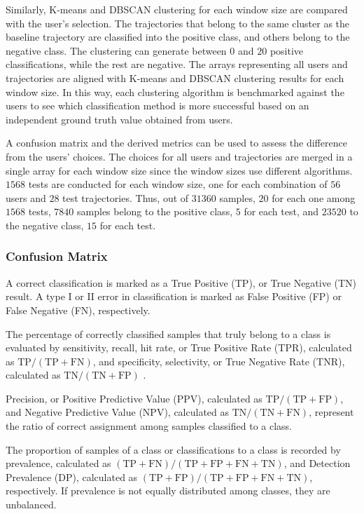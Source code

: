 \documentclass[preprint,12pt]{elsarticle}
\begin{document}
Similarly, K-means and DBSCAN clustering for each window size are compared with the user's selection. The trajectories that belong to the same cluster as the baseline trajectory are classified into the positive class, and others belong to the negative class. The clustering can generate between $0$ and $20$ positive classifications, while the rest are negative. The arrays representing all users and trajectories are aligned with K-means and DBSCAN clustering results for each window size. In this way, each clustering algorithm is benchmarked against the users to see which classification method is more successful based on an independent ground truth value obtained from users.

A confusion matrix and the derived metrics can be used to assess the difference from the users' choices. The choices for all users and trajectories are merged in a single array for each window size since the window sizes use different algorithms. $1568$ tests are conducted for each window size, one for each combination of $56$ users and $28$ test trajectories. Thus, out of $31360$ samples, $20$ for each one among $1568$ tests, $7840$ samples belong to the positive class, $5$ for each test, and $23520$ to the negative class, $15$ for each test.

\subsubsection{Confusion Matrix}

A correct classification is marked as a True Positive (TP), or True Negative (TN) result. A type I or II error in classification is marked as False Positive (FP) or False Negative (FN), respectively.

The percentage of correctly classified samples that truly belong to a class is evaluated by sensitivity, recall, hit rate, or True Positive Rate (TPR), calculated as $\mathrm{TP}/(\mathrm{TP}+\mathrm{FN})$, and specificity, selectivity, or True Negative Rate (TNR), calculated as $\mathrm{TN}/(\mathrm{TN}+\mathrm{FP})$ \cite{altman1994diagnostic1, altman1994diagnostic2}.

Precision, or Positive Predictive Value (PPV), calculated as $\mathrm{TP}/(\mathrm{TP}+\mathrm{FP})$, and Negative Predictive Value (NPV), calculated as $\mathrm{TN}/(\mathrm{TN}+\mathrm{FN})$, represent the ratio of correct assignment among samples classified to a class.

The proportion of samples of a class or classifications to a class is recorded by prevalence, calculated as $(\mathrm{TP}+\mathrm{FN})/(\mathrm{TP}+\mathrm{FP}+\mathrm{FN}+\mathrm{TN})$, and Detection Prevalence (DP), calculated as $(\mathrm{TP}+\mathrm{FP})/(\mathrm{TP}+\mathrm{FP}+\mathrm{FN}+\mathrm{TN})$, respectively. If prevalence is not equally distributed among classes, they are unbalanced.
\end{document}
